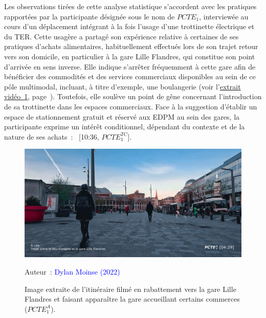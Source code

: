 \begin{refsegment}
Les observations tirées de cette analyse statistique s'accordent avec les pratiques rapportées par la participante désignée sous le nom de \(PCTE_{1}\), interviewée au cours d'un déplacement intégrant à la fois l'usage d'une trottinette électrique et du \acrshort{TER}. Cette usagère a partagé son expérience relative à certaines de ses pratiques d'achats alimentaires, habituellement effectués lors de son trajet retour vers son domicile, en particulier à la gare Lille Flandres, qui constitue son point d'arrivée en sens inverse. Elle indique s'arrêter fréquemment à cette gare afin de bénéficier des commodités et des services commerciaux disponibles au sein de ce pôle multimodal, incluant, à titre d'exemple, une boulangerie (voir l'\hyperref[fig-chap5:pcte1a-commerces-lille-flandres]{extrait vidéo~\ref{fig-chap5:pcte1a-commerces-lille-flandres}}, page~\pageref{fig-chap5:pcte1a-commerces-lille-flandres}). Toutefois, elle soulève un point de gêne concernant l'introduction de sa trottinette dans les espaces commerciaux. Face à la suggestion d'établir un espace de stationnement gratuit et réservé aux \acrshort{EDPM} au sein des gares, la participante exprime un intérêt conditionnel, dépendant du contexte et de la nature de ses achats~: ~[10:36, \(PCTE^{TC}_{1}\)].%
    
    \begin{figure}[h!]\vspace*{4pt}
        \caption{Image extraite de l'itinéraire filmé en rabattement vers la gare Lille Flandres et faisant apparaître la gare accueillant certains commerces (\(PCTE^{A}_{1}\)).}
        \label{fig-chap5:pcte1a-commerces-lille-flandres}
        \centerline{\includegraphics[width=1\columnwidth]{src/Figures/Chap-5/FR_Detours_PCTE1_Access_13.jpg}}
        \vspace{5pt}
        \begin{flushright}\scriptsize{
        Auteur~: \textcolor{blue}{Dylan Moinse (2022)}
        }\end{flushright}
    \end{figure}


\end{refsegment}
